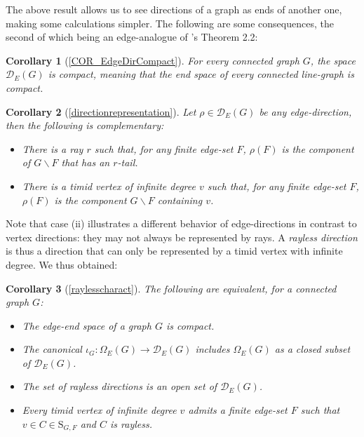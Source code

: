 \documentclass[10pt]{article}
\numberwithin{equation}{subsection}
\newtheorem*{corollary*}{Corollary}
\theoremstyle{remark}
\begin{document}
The above result allows us to see directions of a graph as ends of another one, making some calculations simpler. The following are some consequences, the second of which being an edge-analogue of \cite{DIESTEL2003197}'s Theorem 2.2:

\begin{corollary*}[\ref{COR_EdgeDirCompact}]
    For every connected graph $G$, the space $\mathcal{D}_E(G)$ is compact, meaning that the end space of every connected line-graph is compact.
\end{corollary*}

\begin{corollary*}[\ref{directionrepresentation}]
    Let $\rho \in \mathcal{D}_E(G)$ be any edge-direction, then the following is complementary:
    \begin{itemize}
        \item[(i)] There is a ray $r$ such that, for any finite edge-set $F$, $\rho(F)$ is the component of $G \backslash F$ that has an $r$-tail.
        \item[(ii)] There is a timid vertex of infinite degree $v$ such that, for any finite edge-set $F$, $\rho(F)$ is the component $G \backslash F$ containing $v$.
    \end{itemize}
\end{corollary*}

Note that case (ii) illustrates a different behavior of edge-directions in contrast to vertex directions: they may not always be represented by rays. A \emph{rayless direction} is thus a direction that can only be represented by a timid vertex with infinite degree. We thus obtained:

\begin{corollary*}[{\ref{raylesscharact}}]
    The following are equivalent, for a connected graph $G$:
    \begin{itemize}
        \item[(i)] The edge-end space of a graph $G$ is compact. 
        \item[(ii)] The canonical $\iota_G:\Omega_E(G) \rightarrow \mathcal{D}_E(G)$ includes $\Omega_E(G)$ as a closed subset of $\mathcal{D}_E(G)$.
        \item[(iii)] The set of rayless directions is an open set of $\mathcal{D}_E(G)$.
        \item[(iv)] Every timid vertex of infinite degree $v$ admits a finite edge-set $F$ such that $v \in C \in \mathrm{S}_{G,F}$ and $C$ is rayless.
    \end{itemize}
\end{corollary*}
\end{document}

